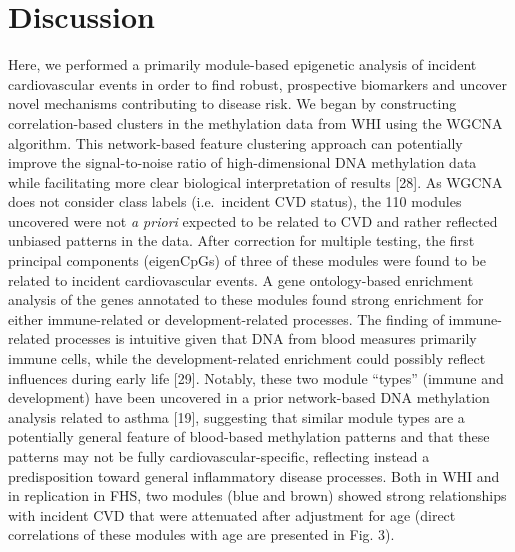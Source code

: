 \documentclass[]{bmcart}
\theoremstyle{definition}
\theoremstyle{definition}
\theoremstyle{definition}
\theoremstyle{remark}
\begin{document}
\section{Discussion}\label{discussion}

Here, we performed a primarily module-based epigenetic analysis of
incident cardiovascular events in order to find robust, prospective
biomarkers and uncover novel mechanisms contributing to disease risk. We
began by constructing correlation-based clusters in the methylation data
from WHI using the WGCNA algorithm. This network-based feature
clustering approach can potentially improve the signal-to-noise ratio of
high-dimensional DNA methylation data while facilitating more clear
biological interpretation of results {[}28{]}. As WGCNA does not
consider class labels (i.e.~incident CVD status), the 110 modules
uncovered were not \emph{a priori} expected to be related to CVD and
rather reflected unbiased patterns in the data. After correction for
multiple testing, the first principal components (eigenCpGs) of three of
these modules were found to be related to incident cardiovascular
events. A gene ontology-based enrichment analysis of the genes annotated
to these modules found strong enrichment for either immune-related or
development-related processes. The finding of immune-related processes
is intuitive given that DNA from blood measures primarily immune cells,
while the development-related enrichment could possibly reflect
influences during early life {[}29{]}. Notably, these two module
``types'' (immune and development) have been uncovered in a prior
network-based DNA methylation analysis related to asthma {[}19{]},
suggesting that similar module types are a potentially general feature
of blood-based methylation patterns and that these patterns may not be
fully cardiovascular-specific, reflecting instead a predisposition
toward general inflammatory disease processes. Both in WHI and in
replication in FHS, two modules (blue and brown) showed strong
relationships with incident CVD that were attenuated after adjustment
for age (direct correlations of these modules with age are presented in
Fig. 3).
\end{document}
